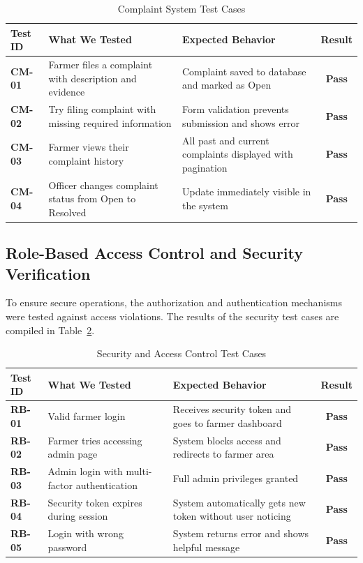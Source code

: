 \begin{table}[htbp]
  \centering
  \caption{Complaint System Test Cases}
  \label{tab:complainttestcases}
  \small
  \renewcommand{\arraystretch}{1.1}
  \begin{tabularx}{\textwidth}{|p{1.6cm}|X|X|c|}
    \hline
    \textbf{Test ID} & \textbf{What We Tested} & \textbf{Expected Behavior} & \textbf{Result} \\
    \hline
    \textbf{CM-01} & Farmer files a complaint with description and evidence & Complaint saved to database and marked as Open & \textbf{Pass} \\
    \hline
    \textbf{CM-02} & Try filing complaint with missing required information & Form validation prevents submission and shows error & \textbf{Pass} \\
    \hline
    \textbf{CM-03} & Farmer views their complaint history & All past and current complaints displayed with pagination & \textbf{Pass} \\
    \hline
    \textbf{CM-04} & Officer changes complaint status from Open to Resolved & Update immediately visible in the system & \textbf{Pass} \\
    \hline
  \end{tabularx}
\end{table}

\subsection{Role-Based Access Control and Security Verification}

To ensure secure operations, the authorization and authentication mechanisms were tested against access violations. The results of the security test cases are compiled in Table~\ref{tab:rbactestcases}.

\begin{table}[htbp]
  \centering
  \caption{Security and Access Control Test Cases}
  \label{tab:rbactestcases}
  \small
  \renewcommand{\arraystretch}{1.1}
  \begin{tabularx}{\textwidth}{|p{1.6cm}|X|X|c|}
    \hline
    \textbf{Test ID} & \textbf{What We Tested} & \textbf{Expected Behavior} & \textbf{Result} \\
    \hline
    \textbf{RB-01} & Valid farmer login & Receives security token and goes to farmer dashboard & \textbf{Pass} \\
    \hline
    \textbf{RB-02} & Farmer tries accessing admin page & System blocks access and redirects to farmer area & \textbf{Pass} \\
    \hline
    \textbf{RB-03} & Admin login with multi-factor authentication & Full admin privileges granted & \textbf{Pass} \\
    \hline
    \textbf{RB-04} & Security token expires during session & System automatically gets new token without user noticing & \textbf{Pass} \\
    \hline
    \textbf{RB-05} & Login with wrong password & System returns error and shows helpful message & \textbf{Pass} \\
    \hline
  \end{tabularx}
\end{table}

